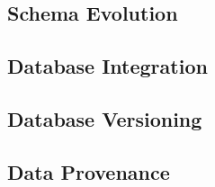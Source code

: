 




\subsection{Schema Evolution}
\label{sec:sch-evo}

\subsection{Database Integration}
\label{sec:db-intg}

\subsection{Database Versioning}
\label{sec:db-ver}

\subsection{Data Provenance}
\label{sec:db-prov}


